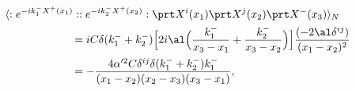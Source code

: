\begin{equation}
\begin{split}
&\langle :e^{-ik_1^-X^+(x_1)}: :e^{-ik_2^-X^+(x_2)}: 
\prt X^i(x_1) \prt X^j(x_2)\prt X^-(x_3)
\rangle_N\\
& \qquad \qquad \qquad = iC \delta (k_1^- + k_2^-)\Big[
2i \al \Big(\frac{k^-_1}{x_3-x_1}+\frac{k^-_2}{x_3-x_2}\Big)
\Big]\frac{(-2\al \delta^{ij})}{(x_1-x_2)^2}\\
&\qquad \qquad \qquad =-\frac{4\alpha^{\prime 2}C\delta^{ij}
\delta(k_1^- + k_2^-) k^-_1}
{(x_1-x_2)(x_2-x_3)(x_3-x_1)},
\end{split}
\end{equation}

